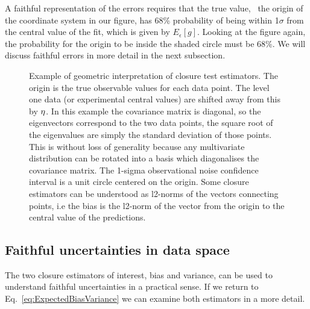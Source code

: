 A faithful representation of the errors requires that the true value, \ie\ the
origin of the coordinate system in our figure, has 68\% probability of being
within 1$\sigma$ from the central value of the fit, which is given by
$E_\epsilon[g]$. Looking at the figure again, the probability for the origin to
be inside the shaded circle must be 68\%. We will discuss faithful errors in
more detail in the next subsection.
%
\begin{figure}[h!]
    \centering
    \caption{Example of geometric interpretation of closure test estimators.
    The origin
    is the true observable values for each data point. The level one data (or
    experimental central values) are
    shifted away from this by $\eta$. In this example the covariance matrix
    is diagonal, so the eigenvectors correspond to the two data points, the
    square root of the eigenvalues are simply the standard deviation of those
    points. This is without loss of generality because any multivariate distribution
    can be rotated into a basis which diagonalises the covariance matrix.
    The 1-sigma observational noise confidence interval
    is a unit circle centered on the origin. Some closure
    estimators can be understood as l2-norms of the vectors connecting points,
    i.e the bias is the l2-norm of the vector from the origin to the central
    value of the predictions.}
    \label{fig:diagram2destimators}
\end{figure}
%

\subsection{Faithful uncertainties in data space}

The two closure estimators of interest, bias and variance, can be used to
understand faithful uncertainties in a practical sense. If we return to
Eq.~\ref{eq:ExpectedBiasVariance} we can examine both estimators in a more
detail.


